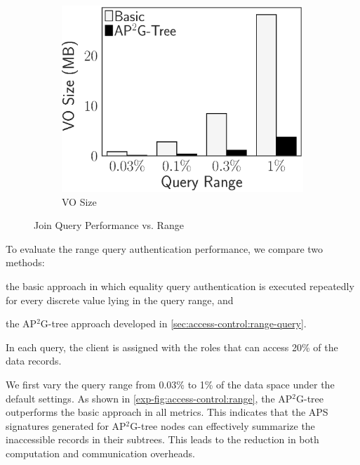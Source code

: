 \begin{figure}[t]
\begin{subfigure}{.33\linewidth}
        \includegraphics[height=\ht\figbox]{exp-figs/access-control/join_vo.eps}
        \caption{VO Size}
    \end{subfigure}
    \caption{Join Query Performance vs. Range}\label{exp-fig:access-control:join}
\end{figure}

To evaluate the range query authentication performance, we compare two methods:
\begin{inlineenum}
    \item the basic approach in which equality query authentication is executed repeatedly for every discrete value lying in the query range, and
    \item the AP$^2$G-tree approach developed in \cref{sec:access-control:range-query}.
\end{inlineenum}
In each query, the client is assigned with the roles that can access 20\% of the data records.

We first vary the query range from 0.03\% to 1\% of the data space under the default settings. As shown in \cref{exp-fig:access-control:range}, the AP$^2$G-tree outperforms the basic approach in all metrics. This indicates that the APS signatures generated for AP$^2$G-tree nodes can effectively summarize the inaccessible records in their subtrees. This leads to the reduction in both computation and communication overheads.


